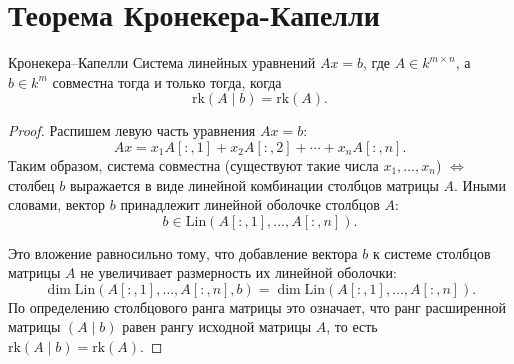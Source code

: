 
\section{Теорема Кронекера-Капелли}

\begin{Theorem}{Кронекера--Капелли}{}
	Система линейных уравнений $Ax = b$, где $A \in k^{m \times n}$, а $b \in k^m$ совместна тогда и только тогда, когда
	\[
	\mathrm{rk}(A \mid b) = \mathrm{rk}(A).
	\]
\end{Theorem}

\begin{proof}
	Распишем левую часть уравнения $Ax = b$:
	\[
	Ax = x_1 A[{:},1] + x_2 A[{:},2] + \cdots + x_n A[{:},n].
	\]
	Таким образом, система совместна (существуют такие числа $x_1, \dots, x_n$) $\Leftrightarrow$ столбец $b$ выражается в виде линейной комбинации столбцов матрицы $A$. Иными словами, вектор $b$ принадлежит линейной оболочке столбцов $A$:
	\[
	b \in \mathrm{Lin}(A[{:},1], \ldots, A[{:},n]).
	\]
	
	Это вложение равносильно тому, что добавление вектора $b$ к системе столбцов матрицы $A$ не увеличивает размерность их линейной оболочки:
	\[
	\dim \mathrm{Lin}(A[{:},1], \ldots, A[{:},n], b) = \dim \mathrm{Lin}(A[{:},1], \ldots, A[{:},n]).
	\]
	По определению столбцового ранга матрицы это означает, что ранг расширенной матрицы $(A \mid b)$ равен рангу исходной матрицы $A$, то есть $\mathrm{rk}(A \mid b) = \mathrm{rk}(A)$.
\end{proof}
